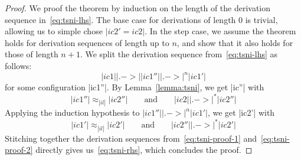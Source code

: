 \begin{proof}
  We proof the theorem by induction on the length of the derivation sequence in~\eqref{eq:tsni-lhs}.
  The base case for derivations
  of length 0 is trivial, allowing
  us to simple chose $|ic2'=ic2|$.  In the step case, we assume
  the theorem holds for derivation sequences of length up to $n$, and show that it also
  holds for those of length $n+1$.  We split the derivation sequence from~\eqref{eq:tsni-lhs} as follows:
  \[
  |ic1| |.->| |ic1''| |.->|^n |ic1'|
  \]
  for some configuration |ic1''|.  By Lemma~\ref{lemma:tsni}, we get
  |ic''| with
  \begin{equation} \label{eq:tsni-proof-1}
  |ic1''| \approx_{|il|} |ic2''|
  \qquad \text{and} \qquad
  |ic2| |.->|^* |ic2''|
  \end{equation}
  Applying the induction hypothesis to
  $|ic1''| |.->|^n |ic1'|$, we get |ic2'| with
  \begin{equation} \label{eq:tsni-proof-2}
  |ic1'| \approx_{|il|} |ic2'|
  \qquad \text{and} \qquad
  |ic2''| |.->|^* |ic2'|
  \end{equation}
  Stitching together the derivation sequences from~\eqref{eq:tsni-proof-1} and~\eqref{eq:tsni-proof-2} directly gives
  us~\eqref{eq:tsni-rhs}, which concludes the proof.
\end{proof}
